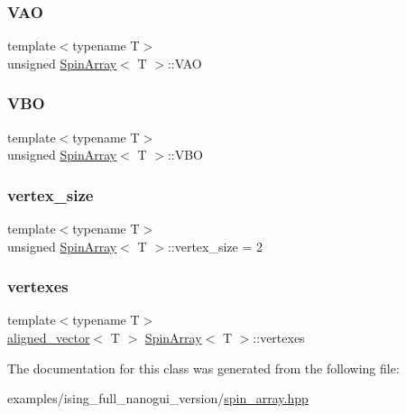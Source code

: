 \mbox{\label{classSpinArray_a401bb65ae9fedcb1fdbd6abe934202c2}} 
\subsubsection{\texorpdfstring{V\+AO}{VAO}}
{\footnotesize\ttfamily template$<$typename T$>$ \\
unsigned \mbox{\hyperlink{classSpinArray}{Spin\+Array}}$<$ T $>$\+::V\+AO\hspace{0.3cm}{\ttfamily [private]}}

\mbox{\label{classSpinArray_a6f7dbbcaa09c3ee96fb7a84f294d27ef}} 
\subsubsection{\texorpdfstring{V\+BO}{VBO}}
{\footnotesize\ttfamily template$<$typename T$>$ \\
unsigned \mbox{\hyperlink{classSpinArray}{Spin\+Array}}$<$ T $>$\+::V\+BO\hspace{0.3cm}{\ttfamily [private]}}

\mbox{\label{classSpinArray_aab5a46c249bbf477555a4fe4273fcb8b}} 
\subsubsection{\texorpdfstring{vertex\+\_\+size}{vertex\_size}}
{\footnotesize\ttfamily template$<$typename T$>$ \\
unsigned \mbox{\hyperlink{classSpinArray}{Spin\+Array}}$<$ T $>$\+::vertex\+\_\+size = 2\hspace{0.3cm}{\ttfamily [private]}}

\mbox{\label{classSpinArray_a41321e5fb43468362ac6d1743d449b45}} 
\subsubsection{\texorpdfstring{vertexes}{vertexes}}
{\footnotesize\ttfamily template$<$typename T$>$ \\
\mbox{\hyperlink{type__definitions_8hpp_a087efd587d66b881646ef378f1919c90}{aligned\+\_\+vector}}$<$ T $>$ \mbox{\hyperlink{classSpinArray}{Spin\+Array}}$<$ T $>$\+::vertexes\hspace{0.3cm}{\ttfamily [private]}}



The documentation for this class was generated from the following file\+:\begin{DoxyCompactItemize}
\item 
examples/ising\+\_\+full\+\_\+nanogui\+\_\+version/\mbox{\hyperlink{ising__full__nanogui__version_2spin__array_8hpp}{spin\+\_\+array.\+hpp}}\end{DoxyCompactItemize}
